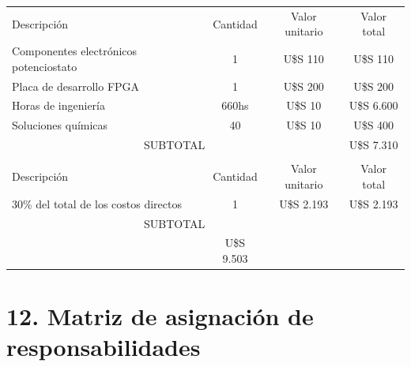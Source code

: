 \documentclass[11pt]{charter}
\begin{document}
\begin{table}[htpb]
\centering
\begin{tabularx}{\linewidth}{@{}|X|c|r|r|@{}}
\hline
\rowcolor[HTML]{C0C0C0} 
\multicolumn{4}{|c|}{\cellcolor[HTML]{C0C0C0}COSTOS DIRECTOS} \\ \hline
\rowcolor[HTML]{C0C0C0} 
Descripción &
  \multicolumn{1}{c|}{\cellcolor[HTML]{C0C0C0}Cantidad} &
  \multicolumn{1}{c|}{\cellcolor[HTML]{C0C0C0}Valor unitario} &
  \multicolumn{1}{c|}{\cellcolor[HTML]{C0C0C0}Valor total} \\ \hline
Componentes electrónicos potenciostato & 
  \multicolumn{1}{c|}{1} & 
  \multicolumn{1}{c|}{U\$S 110} &
  \multicolumn{1}{c|}{U\$S 110} \\ \hline
Placa de desarrollo FPGA &
  \multicolumn{1}{c|}{1} &
  \multicolumn{1}{c|}{U\$S 200} &
  \multicolumn{1}{c|}{U\$S 200} \\ \hline
Horas de ingeniería &
  \multicolumn{1}{c|}{660hs} &
  \multicolumn{1}{c|}{U\$S 10} &
  \multicolumn{1}{c|}{U\$S 6.600} \\ \hline
Soluciones químicas &  
  \multicolumn{1}{c|}{40} &
  \multicolumn{1}{c|}{U\$S 10} &
  \multicolumn{1}{c|}{U\$S 400} \\ \hline 
\multicolumn{3}{|c|}{SUBTOTAL} &
  \multicolumn{1}{c|}{U\$S 7.310} \\ \hline
\rowcolor[HTML]{C0C0C0} 
\hline
\multicolumn{4}{|c|}{\cellcolor[HTML]{C0C0C0}COSTOS INDIRECTOS} \\ \hline
\rowcolor[HTML]{C0C0C0} 
Descripción &
  \multicolumn{1}{c|}{\cellcolor[HTML]{C0C0C0}Cantidad} &
  \multicolumn{1}{c|}{\cellcolor[HTML]{C0C0C0}Valor unitario} &
  \multicolumn{1}{c|}{\cellcolor[HTML]{C0C0C0}Valor total} \\ \hline
30\% del total de los costos directos &
  \multicolumn{1}{c|}{1} &
  \multicolumn{1}{c|}{U\$S 2.193} &
  \multicolumn{1}{c|}{U\$S 2.193} \\ \hline 
\multicolumn{3}{|c|}{SUBTOTAL} &
  \multicolumn{1}{c|}{} \\ \hline
\rowcolor[HTML]{C0C0C0}
\multicolumn{3}{|c|}{TOTAL} &
 U\$S 9.503  \\ \hline
\end{tabularx}%
\end{table}


\section{12. Matriz de asignación de responsabilidades}
\label{sec:responsabilidades}
\end{document}
